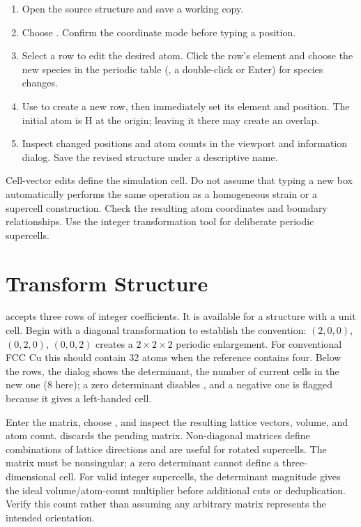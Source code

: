 \begin{enumerate}
\item Open the source structure and save a working copy.
\item Choose . Confirm the coordinate mode before typing a position.
\item Select a row to edit the desired atom. Click the row's element and choose the new species in the periodic table (, a double-click or Enter) for species changes.
\item Use  to create a new row, then immediately set its element and position. The initial atom is H at the origin; leaving it there may create an overlap.
\item Inspect changed positions and atom counts in the viewport and information dialog. Save the revised structure under a descriptive name.
\end{enumerate}
Cell-vector edits define the simulation cell. Do not assume that typing a new box automatically performs the same operation as a homogeneous strain or a supercell construction. Check the resulting atom coordinates and boundary relationships. Use the integer transformation tool for deliberate periodic supercells.

\section{Transform Structure}
 accepts three rows of integer coefficients. It is available for a structure with a unit cell. Begin with a diagonal transformation to establish the convention: $(2,0,0)$, $(0,2,0)$, $(0,0,2)$ creates a $2\times2\times2$ periodic enlargement. For conventional FCC Cu this should contain 32 atoms when the reference contains four. Below the rows, the dialog shows the determinant, the number of current cells in the new one (8 here); a zero determinant disables , and a negative one is flagged because it gives a left-handed cell.

Enter the matrix, choose , and inspect the resulting lattice vectors, volume, and atom count.  discards the pending matrix. Non-diagonal matrices define combinations of lattice directions and are useful for rotated supercells. The matrix must be nonsingular; a zero determinant cannot define a three-dimensional cell. For valid integer supercells, the determinant magnitude gives the ideal volume/atom-count multiplier before additional cuts or deduplication. Verify this count rather than assuming any arbitrary matrix represents the intended orientation.

